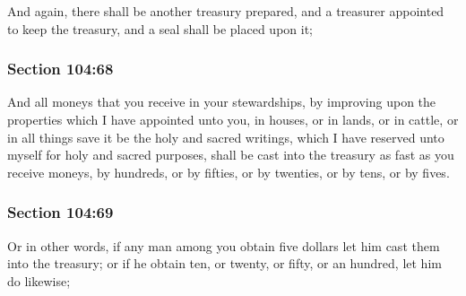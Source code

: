 		And again, there shall be another treasury prepared, and a treasurer appointed to keep the treasury, and a seal shall be placed upon it;


	\subsubsection{Section 104:68} %
		\label{DC104-68}

		And all moneys that you receive in your stewardships, by improving upon the properties which I have appointed unto you, in houses, or in lands, or in cattle, or in all things save it be the holy and sacred writings, which I have reserved unto myself for holy and sacred purposes, shall be cast into the treasury as fast as you receive moneys, by hundreds, or by fifties, or by twenties, or by tens, or by fives.


	\subsubsection{Section 104:69} %
		\label{DC104-69}

		Or in other words, if any man among you obtain five dollars let him cast them into the treasury; or if he obtain ten, or twenty, or fifty, or an hundred, let him do likewise;


